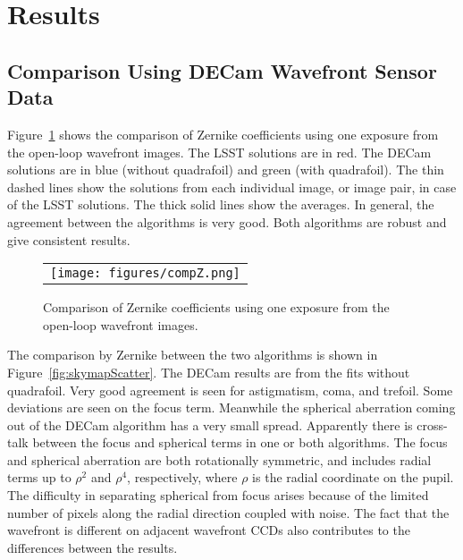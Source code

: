 \documentclass[]{spie}  %
\begin{document}
\section{Results}
\label{sec:results}

\subsection{Comparison Using DECam Wavefront Sensor Data}

Figure~\ref{fig:compZ} shows the comparison of Zernike coefficients using one exposure from the open-loop wavefront images. The LSST solutions are in red. The DECam solutions are in blue (without quadrafoil) and green (with quadrafoil). The thin dashed lines show the solutions from each individual image, or image pair, in case of the LSST solutions. The thick solid lines show the averages. In general, the agreement between the algorithms is very good. Both algorithms are robust and give consistent results.

   \begin{figure} [tphb]
   \begin{center}
   \begin{tabular}{c} %
   \texttt{[image: figures/compZ.png]}
   \end{tabular}
   \end{center}
   \caption[example] 
   { \label{fig:compZ} 
Comparison of Zernike coefficients using one exposure from the open-loop wavefront images. 
}
   \end{figure} 

The comparison by Zernike between the two algorithms is shown in
Figure~\ref{fig:skymapScatter}. The DECam results are from the fits without quadrafoil. 
Very good agreement is seen for astigmatism, coma, and trefoil.
Some deviations are seen on the focus term.
Meanwhile the spherical aberration coming out of the DECam algorithm has a very small spread.
Apparently there is cross-talk between the focus and spherical terms in one or both algorithms.
The focus and spherical aberration are both rotationally symmetric, and includes radial terms up to $\rho^2$ and $\rho^4$, respectively, where $\rho$ is the radial coordinate on the pupil. 
The difficulty in separating spherical from focus arises because of the limited number of pixels along the radial direction coupled with noise.
The fact that the wavefront is different on adjacent wavefront CCDs also contributes to the differences between the results.
\end{document}
